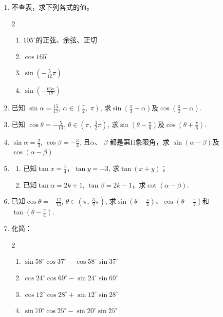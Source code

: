 \begin{enumerate}
    \item 不查表，求下列各式的值。
\begin{multicols}{2}
\begin{enumerate}[(1)]
    \item $105^{\circ}$的正弦、余弦、正切
    \item  $\cos 165^{\circ }$
    \item $\sin \left ( - \frac 5{12}\pi \right ) $
    \item $\sin \left ( - \frac {65\pi }{12}\right ) $
\end{enumerate}    
\end{multicols}
\item 已知 $\sin\alpha = \frac {15}{17}$, $\alpha \in \left ( \frac \pi 2, \;\pi \right )$, 
    求$\sin\left(\frac\pi{3}+\alpha\right)$及$\cos\left(\frac\pi3-\alpha\right)$.
\item    已知 $\cos \theta = - \frac 5{13}$, $\theta \in \left (\pi , \; \frac {3}{2}\pi \right )$, 
    求$\sin\left(\theta-\frac\pi6\right)$及$\cos\left(\theta+\frac\pi6\right)$.
\item $\sin \alpha = \frac 23$, $\cos \beta = - \frac 34$, 且$\alpha$、 $\beta$ 都是第II象限角，求 $\sin(\alpha-\beta)$及$\cos(\alpha-\beta)$
\item \begin{enumerate}[(1)]
\item 已知$\tan x=\frac{1}{4}$，$\tan y=-3$, 求$\tan(x+y)$；
\item 已知$\tan \alpha = 2k+ 1$, $\tan\beta=2k-1$，求$\cot(\alpha-\beta)$.
\end{enumerate}

\item 已知$\cos \theta = - \frac {12}{13}$, $\theta \in \left(\pi,\; \frac{3}{2}\pi\right)$, 求$\sin\left(\theta-\frac{\pi}{4}\right)$、$\cos\left(\theta-\frac{\pi}{4}\right)$和$\tan\left(\theta-\frac{\pi}{4}\right)$.
\item 化简：
\begin{multicols}{2}
\begin{enumerate}[(1)]
    \item $\sin58^{\circ}\cos37^{\circ}-\cos 58^{\circ}\sin37^{\circ}$
    \item $\cos24^{\circ}\cos69^{\circ}-\sin24^{\circ}\sin69^{\circ}$
    \item $\cos12^{\circ}\cos28^{\circ}+\sin12^{\circ}\sin28^{\circ}$
    \item $\sin70^{\circ}\cos25^{\circ}-\sin20^{\circ}\sin25^{\circ}$
\end{enumerate}    
\end{multicols}

\end{enumerate}

